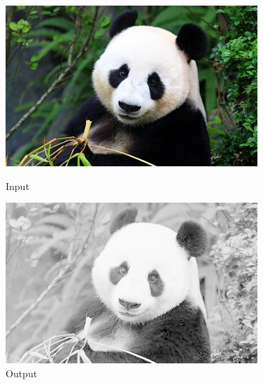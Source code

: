 \documentclass[a4paper,8pt]{article}
\begin{document}
        \begin{figure}[H]
        \centering
        \begin{minipage}{0.4\linewidth}
        \centering
        \includegraphics[width=\linewidth]{output/input1.jpg}
        \caption{Input}
        \end{minipage}
        \hfill
        \begin{minipage}{0.4\linewidth}
        \centering
        \includegraphics[width=\linewidth]{output/Log Transformation_output.png}
        \caption{Output}
        \end{minipage}
        \end{figure}
        \clearpage
        
\end{document}
